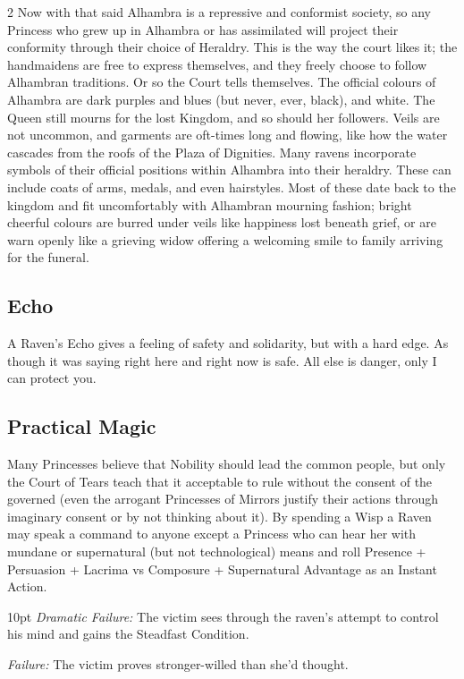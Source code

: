 \begin{multicols}{2}
Now with that said Alhambra is a repressive and conformist society, so any Princess who grew up in Alhambra or has assimilated will project their conformity through their choice of Heraldry. This is the way the court likes it; the handmaidens are free to express themselves, and they freely choose to follow Alhambran traditions. Or so the Court tells themselves. The official colours of Alhambra are dark purples and blues (but never, ever, black), and white. The Queen still mourns for the lost Kingdom, and so should her followers. Veils are not uncommon, and garments are oft-times long and flowing, like how the water cascades from the roofs of the Plaza of Dignities. Many ravens incorporate symbols of their official positions within Alhambra into their heraldry. These can include coats of arms, medals, and even hairstyles. Most of these date back to the kingdom and fit uncomfortably with Alhambran mourning fashion; bright cheerful colours are burred under veils like happiness lost beneath grief, or are warn openly like a grieving widow offering a welcoming smile to family arriving for the funeral. 

\subsection*{Echo}
A Raven's Echo gives a feeling of safety and solidarity, but with a hard edge. As though it was saying right here and right now is safe. All else is danger, only I can protect you. 
\subsection*{Practical Magic}
Many Princesses believe that Nobility should lead the common people, but only the Court of Tears teach that it acceptable to rule without the consent of the governed (even the arrogant Princesses of Mirrors justify their actions through imaginary consent or by not thinking about it). By spending a Wisp a Raven may speak a command to anyone except a Princess who can hear her with mundane or supernatural (but not technological) means and roll Presence + Persuasion + Lacrima vs Composure + Supernatural Advantage as an Instant Action.

\begin{myindentpar}{10pt} \emph{Dramatic Failure:} The victim sees through the raven’s attempt to control his mind and gains the Steadfast Condition.
   
    \emph{Failure:} The victim proves stronger-willed than she’d thought.
	

\end{myindentpar}
\end{multicols}
